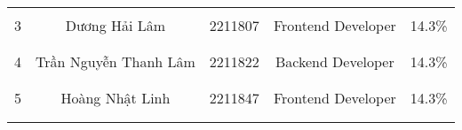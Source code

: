 \begin{table}[H]
\begin{tabular}{|c|c|c|c|p{4cm}|}
                    &                                           &                                   &                                                           &                                                                   \\ \cline{5-5} 
\multirow{-3}{*}{3} & \multirow{-3}{*}{Dương Hải Lâm}           & \multirow{-3}{*}{2211807}         & \multirow{-3}{3cm}{\centering Frontend Developer}         & \multirow{-3}{3cm}{14.3\%}                                        \\ \hline
                    &                                           &                                   &                                                           &                                                                   \\ \cline{5-5} 
                    &                                           &                                   &                                                           &                                                                   \\ \cline{5-5} 
\multirow{-3}{*}{4} & \multirow{-3}{*}{Trần Nguyễn Thanh Lâm}   & \multirow{-3}{*}{2211822}         & \multirow{-3}{3cm}{\centering Backend Developer}          & \multirow{-3}{3cm}{14.3\%}                                        \\ \hline
                    &                                           &                                   &                                                           &                                                                   \\ \cline{5-5} 
                    &                                           &                                   &                                                           &                                                                   \\ \cline{5-5}  
\multirow{-3}{*}{5} & \multirow{-3}{*}{Hoàng Nhật Linh}         & \multirow{-3}{*}{2211847}         & \multirow{-3}{3cm}{\centering Frontend Developer}         & \multirow{-3}{3cm}{14.3\%}                                        \\ \hline
                    &                                           &                                   &                                                           &                                                                   \\ \cline{5-5} 
                    &                                           &                                   &                                                           &                                                                   \\ \cline{5-5}  

\end{tabular}
\end{table}
